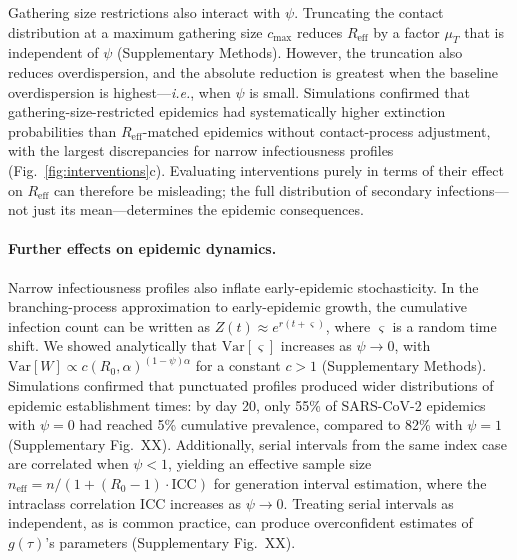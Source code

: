 \documentclass[10pt]{article}
\makeatletter
\newcommand{\ie}{\textit{i.e.}\@\xspace}
\makeatother
\begin{document}
Gathering size restrictions also interact with $\psi$. Truncating the contact distribution at a maximum gathering size $c_\text{max}$ reduces $R_\text{eff}$ by a factor $\mu_T$ that is independent of $\psi$ (Supplementary Methods). However, the truncation also reduces overdispersion, and the absolute reduction is greatest when the baseline overdispersion is highest---\ie, when $\psi$ is small. Simulations confirmed that gathering-size-restricted epidemics had systematically higher extinction probabilities than $R_\text{eff}$-matched epidemics without contact-process adjustment, with the largest discrepancies for narrow infectiousness profiles (Fig.~\ref{fig:interventions}c). Evaluating interventions purely in terms of their effect on $R_\text{eff}$ can therefore be misleading; the full distribution of secondary infections---not just its mean---determines the epidemic consequences.

\paragraph{Further effects on epidemic dynamics.}
Narrow infectiousness profiles also inflate early-epidemic stochasticity. In the branching-process approximation to early-epidemic growth, the cumulative infection count can be written as $Z(t) \approx e^{r(t + \varsigma)}$, where $\varsigma$ is a random time shift\citep{morris_computation_2024}. We showed analytically that $\text{Var}[\varsigma]$ increases as $\psi \to 0$, with $\text{Var}[W] \propto c(R_0, \alpha)^{(1-\psi)\alpha}$ for a constant $c > 1$ (Supplementary Methods). Simulations confirmed that punctuated profiles produced wider distributions of epidemic establishment times: by day 20, only 55\% of SARS-CoV-2 epidemics with $\psi = 0$ had reached 5\% cumulative prevalence, compared to 82\% with $\psi = 1$ (Supplementary Fig.~XX). Additionally, serial intervals from the same index case are correlated when $\psi < 1$, yielding an effective sample size $n_\text{eff} = n / (1 + (R_0 - 1) \cdot \text{ICC})$ for generation interval estimation, where the intraclass correlation ICC increases as $\psi \to 0$. Treating serial intervals as independent, as is common practice, can produce overconfident estimates of $g(\tau)$'s parameters (Supplementary Fig.~XX).
\end{document}

